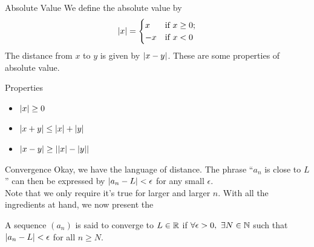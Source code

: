\documentclass{beamer}
\begin{document}
\begin{frame}{Absolute Value}
  We define the absolute value by
  \[
    \abs{x}=
    \begin{cases}
      x &\text{if }x\geq 0;\\
      -x &\text{if }x<0
    \end{cases}
  \]
  The distance from $x$ to $y$ is given by $\abs{x-y}$.
  These are some properties of absolute value.
  \begin{block}{Properties}
    \begin{itemize}
      \item $\abs{x}\geq 0$
      \item $\abs{x+y}\leq \abs{x}+\abs{y}$
      \item $\abs{x-y}\geq \abs*{\abs{x}-\abs{y}}$
    \end{itemize}
  \end{block}
\end{frame}



\begin{frame}{Convergence}
  Okay, we have the language of distance. 
  The phrase ``$a_n$ is close to $L$'' can then be expressed by
  $\abs{a_n-L}<\epsilon$ for any small $\epsilon$.\\[0.3cm]

  Note that we only require it's true for larger and larger $n$.
  With all the ingredients at hand, we now present the

  \begin{definition}[Convergence]
    A sequence $(a_n)$ is said to converge to $L\in\R$ if 
    $\forall\epsilon>0,~ \exists N\in\N$ such that
    $\abs{a_n-L}<\epsilon$ for all $n\geq N$.
  \end{definition}

\end{frame}
\end{document}
